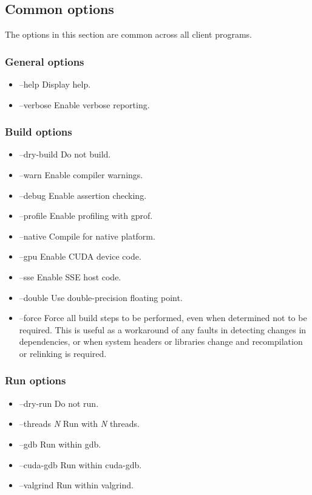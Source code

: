 \subsection{Common options\label{Common_options}}

The options in this section are common across all client programs.

\subsubsection{General options}
\begin{itemize}
\item {\sf --help} Display help.
\item {\sf --verbose} Enable verbose reporting.
\end{itemize}

\subsubsection{Build options}
\begin{itemize}
\item {\sf --dry-build} Do not build.
\item {\sf --warn} Enable compiler warnings.
\item {\sf --debug} Enable assertion checking.
\item {\sf --profile} Enable profiling with {\sf gprof}.
\item {\sf --native} Compile for native platform.
\item {\sf --gpu} Enable CUDA device code.
\item {\sf --sse} Enable SSE host code.
\item {\sf --double} Use double-precision floating point.
\item {\sf --force} Force all build steps to be performed, even when
  determined not to be required. This is useful as a workaround of any faults
  in detecting changes in dependencies, or when system headers or libraries
  change and recompilation or relinking is required.
\end{itemize}

\subsubsection{Run options}
\begin{itemize}
\item {\sf --dry-run} Do not run.
\item {\sf --threads \textit{N}} Run with {\sf \textit{N}} threads.
\item {\sf --gdb} Run within {\sf gdb}.
\item {\sf --cuda-gdb} Run within {\sf cuda-gdb}.
\item {\sf --valgrind} Run within {\sf valgrind}.
\end{itemize}
